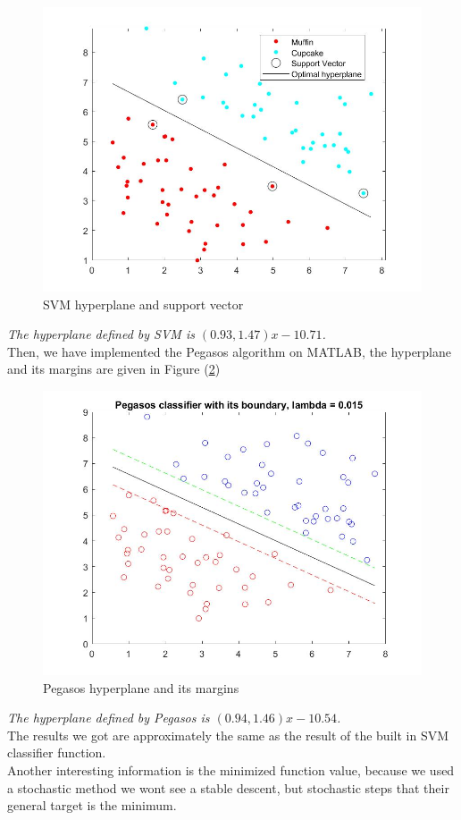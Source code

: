 \documentclass[12pt]{article}
\begin{document}
\begin{figure}[H]
  \centering
    \includegraphics[scale=0.25]{SVM.jpg}
    \caption{SVM hyperplane and support vector}
    \label{fig:svm}
 \end{figure}
\textit{The hyperplane defined by SVM is $(0.93,1.47)x -10.71$.}\\
Then, we have implemented the Pegasos algorithm on MATLAB, the hyperplane and its margins are given in Figure (\ref{fig:Pegasos})
 \begin{figure}[H]
  \centering
    \includegraphics[scale=0.25]{Pegasos.jpg}
    \caption{Pegasos hyperplane and its margins}
    \label{fig:Pegasos}
 \end{figure}
\textit{The hyperplane defined by Pegasos is $(0.94,1.46)x -10.54$.}\\
The results we got are approximately the same as the result of the built in SVM classifier function. \\
Another interesting information is the minimized function value, because we used a stochastic method we wont see a stable descent, but stochastic steps that their general target is the minimum.
\end{document}
